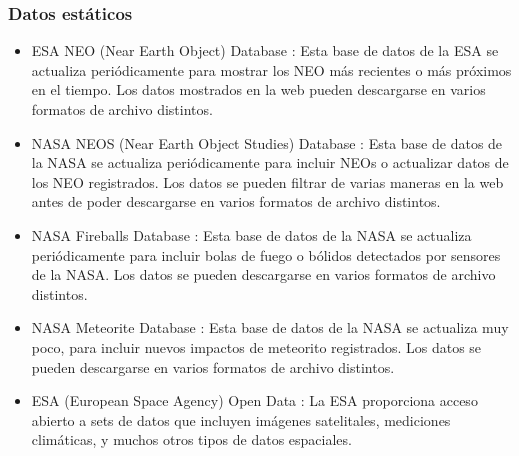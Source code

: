 \subsubsection*{Datos estáticos}
\begin{itemize}
  \item ESA NEO (Near Earth Object) Database \cite{esa-neo-db}: Esta base de datos de la ESA se actualiza periódicamente para mostrar los NEO más recientes o más próximos en el tiempo. Los datos mostrados en la web pueden descargarse en varios formatos de archivo distintos.
  \item NASA NEOS (Near Earth Object Studies) Database \cite{nasa-cneos-db}: Esta base de datos de la NASA se actualiza periódicamente para incluir NEOs o actualizar datos de los NEO registrados. Los datos se pueden filtrar de varias maneras en la web antes de poder descargarse en varios formatos de archivo distintos.
  \item NASA Fireballs Database \cite{nasa-fireballs-db}: Esta base de datos de la NASA se actualiza periódicamente para incluir bolas de fuego o bólidos detectados por sensores de la NASA. Los datos se pueden descargarse en varios formatos de archivo distintos.
  \item NASA Meteorite Database \cite{nasa-meteorite-db}: Esta base de datos de la NASA se actualiza muy poco, para incluir nuevos impactos de meteorito registrados. Los datos se pueden descargarse en varios formatos de archivo distintos.

  \item ESA (European Space Agency) Open Data \cite{esa-open-db}: La ESA proporciona acceso abierto a sets de datos que incluyen imágenes satelitales, mediciones climáticas, y muchos otros tipos de datos espaciales.
\end{itemize}


